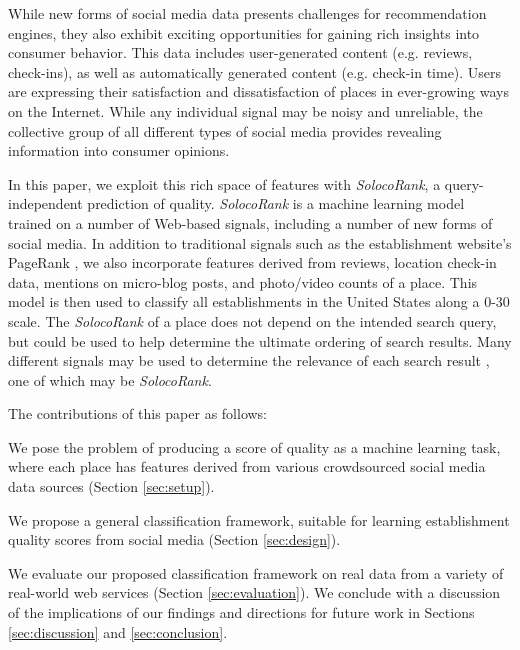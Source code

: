 While new forms of social media data presents challenges for recommendation engines,
they also exhibit exciting opportunities for gaining rich insights into consumer behavior.
This data includes user-generated content (e.g. reviews, check-ins),
as well as automatically generated content (e.g. check-in time).
Users are expressing their satisfaction and dissatisfaction of places in
ever-growing ways on the Internet.
While any individual signal may be noisy and unreliable, the collective group
of all different types of social media provides revealing information
into consumer opinions.

In this paper, we exploit this rich space of features with \emph{SolocoRank},
a query-independent prediction of quality.
\emph{SolocoRank} is a machine learning model trained on a number of Web-based signals,
including a number of new forms of social media.
In addition to traditional signals such as the establishment website's PageRank \cite{pagerank},
we also incorporate features derived from reviews, location check-in data,
mentions on micro-blog posts, and photo/video counts of a place.
This model is then used to classify all establishments in the United States along a 0-30 scale.
The \emph{SolocoRank} of a place does not depend on the intended search query,
but could be used to help determine the ultimate ordering of search results.
Many different signals may be used to determine the relevance 
of each search result \cite{bartell1994}, one of which may be \emph{SolocoRank}.

The contributions of this paper as follows:
\squishlist
  \item We pose the problem of producing a score of quality
  as a machine learning task, where each place has features
  derived from various crowdsourced social media data sources 
  (Section \ref{sec:setup}).
  \item We propose a general classification framework,
  suitable for learning establishment quality scores
  from social media (Section \ref{sec:design}).
  \item We evaluate our proposed classification framework
  on real data from a variety of real-world web services
  (Section \ref{sec:evaluation}).
\squishend
We conclude with a discussion of the implications of our findings and 
directions for future work in Sections \ref{sec:discussion} and \ref{sec:conclusion}.
